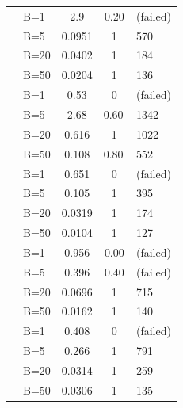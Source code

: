 \documentclass[acmsmall]{acmart}
\begin{document}
\begin{table}[t]
\begin{tabular}{@{} l l S[scientific-notation=true] S[table-format=1.2] l @{}}
    \midrule
     &    B=1              & \num{2.9} & \num{0.20} & (failed) \\
    &  B=5             & \num{0.0951} &  {1} & \num{570} \\
    &  B=20            & \num{0.0402} &  {1} & \num{184} \\
    &    B=50            & \num{0.0204} &  {1} & \num{136} \\ 
    \midrule
     &   B=1              & \num{0.53} & \num{0} & (failed) \\
    &  B=5             & \num{2.68} & {\num{0.60}\,} & \num{1342} \\
    &  B=20            & \num{0.616} &  {1} & \num{1022} \\
    &  B=50            & \num{0.108} & {\num{0.80}\,} & \num{552} \\ 
  
    \midrule
       &  B=1 & \num{0.651} & \num{0} & (failed) \\
    &  B=5      & \num{0.105} &  {1} & \num{395} \\
    &  B=20     & \num{0.0319} &  {1} & \num{174} \\
    &  B=50     & \num{0.0104} &  {1} & \num{127} \\
     \midrule
         & B=1      & \num{0.956} & \num{0.00} & (failed) \\
    & B=5      & \num{0.396} & \num{0.40} & (failed) \\
    & B=20     & \num{0.0696} &  {1} & \num{715} \\
    & B=50     & \num{0.0162} &  {1} & \num{140} \\
     \midrule
       &  B=1 & \num{0.408} & \num{0} & (failed) \\
    &  B=5      & \num{0.266} &  {1} & \num{791} \\
    &  B=20     & \num{0.0314} &  {1} & \num{259} \\
    &  B=50     & \num{0.0306} &  {1} & \num{135} \\
    \bottomrule





\end{tabular}
\end{table}
\end{document}
